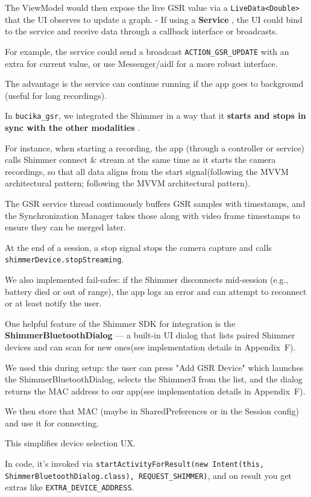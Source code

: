 {{The ViewModel would then expose the live GSR value via a \texttt{LiveData<Double>}
that the UI observes to update a graph.  - If using a \textbf{Service}
, the UI could bind to the service and receive data through a callback interface or
broadcasts.

For example, the service could send a broadcast \texttt{ACTION_GSR_UPDATE} with an
extra for current value, or use Messenger/aidl for a more robust interface.

The advantage is the service can continue running if the app goes to background
(useful for long recordings).

In \texttt{bucika_gsr}, we integrated the Shimmer in a way that it \textbf{starts and
stops in sync with the other modalities}
.

For instance, when starting a recording, the app (through a controller or service)
calls Shimmer connect & stream at the same time as it starts the camera recordings,
so that all data aligns from the start signal(following the MVVM architectural
pattern; following the MVVM architectural pattern).

The GSR service thread continuously buffers GSR samples with timestamps, and the
Synchronization Manager takes those along with video frame timestamps to ensure they
can be merged later.

At the end of a session, a stop signal stops the camera capture and calls
\texttt{shimmerDevice.stopStreaming}.

We also implemented fail-safes: if the Shimmer disconnects mid-session (e.g., battery
died or out of range), the app logs an error and can attempt to reconnect or at least
notify the user.

One helpful feature of the Shimmer SDK for integration is the
\textbf{ShimmerBluetoothDialog}
 --- a built-in UI dialog that lists paired Shimmer devices and can scan for new
 ones(see implementation details in Appendix~F).

We used this during setup: the user can press "Add GSR Device" which launches the
ShimmerBluetoothDialog, selects the Shimmer3 from the list, and the dialog returns
the MAC address to our app(see implementation details in Appendix~F).

We then store that MAC (maybe in SharedPreferences or in the Session config) and use
it for connecting.

This simplifies device selection UX.

In code, it's invoked via \texttt{startActivityForResult(new Intent(this,
ShimmerBluetoothDialog.class), REQUEST_SHIMMER)}, and on result you get extras like
\texttt{EXTRA_DEVICE_ADDRESS}.

}}
